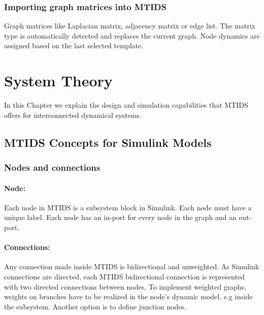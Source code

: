 \documentclass[a4paper,twoside, openright,12pt]{report}
\begin{document}
\subsection{Importing graph matrices into MTIDS}
Graph matrices like Laplacian matrix, adjacency matrix or edge list. The matrix type is automatically detected and replaces the current graph. Node dynamics are assigned based on the last selected template.


\chapter{System Theory}\label{chapter3}

In this Chapter we explain the design and simulation capabilities that MTIDS offers for interconnected dynamical systems.

\section{MTIDS Concepts for Simulink Models} \label{subsystemConcept}
\subsection{Nodes and connections}
\subsubsection{Node:}
Each node in MTIDS is a subsystem block in Simulink. Each node must have a unique label.
Each node has an in-port for every node in the graph and an out-port. 
\subsubsection{Connections:}
Any connection made inside MTIDS is bidirectional and unweighted. As Simulink connections are directed, each MTIDS bidirectional connection
 is represented with two directed connections between nodes. To implement weighted graphs, weights 
on branches have to be realized in the node's dynamic model, e.g inside the subsystem. Another option is to define junction nodes.
\end{document}
